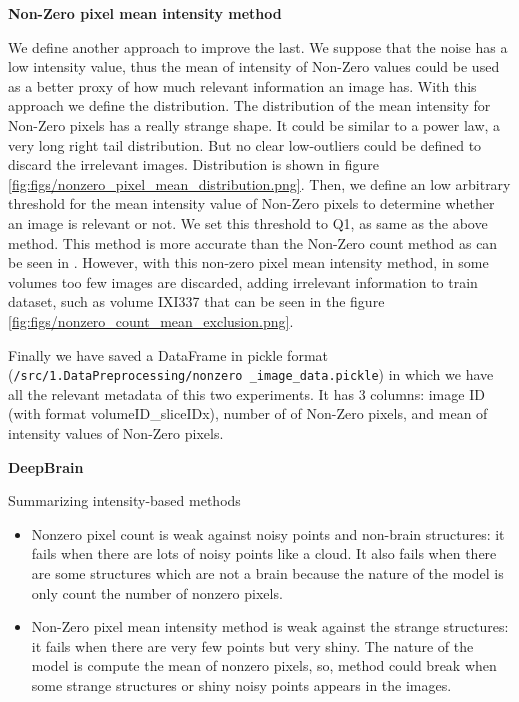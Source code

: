 \textbf{Non-Zero pixel mean intensity method}

We define another approach to improve the last. We suppose that the noise has a low intensity value, thus the mean of intensity of Non-Zero values could be used as a better proxy of how much relevant information an image has. With this approach we define the distribution. The distribution of the mean intensity for Non-Zero pixels has a really strange shape. It could be similar to a power law, a very long right tail distribution. But no clear low-outliers could be defined to discard the irrelevant images. Distribution is shown in figure \ref{fig:figs/nonzero_pixel_mean_distribution.png}. Then, we define an low arbitrary threshold for the mean intensity value of Non-Zero pixels to determine whether an image is relevant or not. We set this threshold to Q1, as same as the above method. This method is more accurate than the Non-Zero count method as can be seen in . However, with this non-zero pixel mean intensity method, in some volumes too few images are discarded, adding irrelevant information to train dataset, such as volume IXI337 that can be seen in the figure \ref{fig:figs/nonzero_count_mean_exclusion.png}. 

Finally we have saved a DataFrame in pickle format (\texttt{/src/1.DataPreprocessing/nonzero \_image\_data.pickle}) in which we have all the relevant metadata of this two experiments. It has 3 columns: image ID (with format volumeID\_sliceIDx), number of of Non-Zero pixels, and mean of intensity values of Non-Zero pixels.


\FloatBarrier


\textbf{DeepBrain}

Summarizing intensity-based methods
\begin{itemize}
    \item Nonzero pixel count is weak against noisy points and non-brain structures: it fails when there are lots of noisy points like a cloud. It also fails when there are some structures which are not a brain because the nature of the model is only count the number of nonzero pixels.
    \item Non-Zero pixel mean intensity method is weak against the strange structures: it fails when there are very few points but very shiny. The nature of the model is compute the mean of nonzero pixels, so, method could break when some strange structures or shiny noisy points appears in the images.
\end{itemize}

